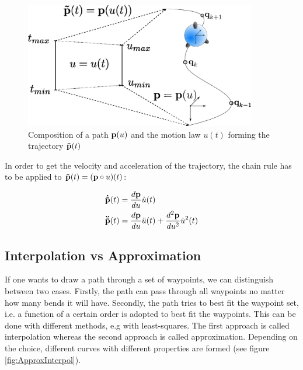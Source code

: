 \begin{figure}[H]
	\centering
    \includegraphics[width = 0.9\textwidth]{graphics/PathTrajectory.eps}
  \caption{Composition of a path ${\bf p}(u)$ and the motion law $u(t)$ forming the trajectory ${\bf \tilde{p}}(t)$}
  \label{fig:path_trajectory}
\end{figure}


In order to get the velocity and acceleration of the trajectory, the chain rule has to be applied to ${\bf \tilde{p}}(t)=({\bf p}\circ u)(t)$:

\begin{align}\label{vel_acc}
{\bf \dot{\tilde{p}}}(t) &= \frac{d {\bf p}}{du}\dot{u}(t) \\
{\bf \ddot{\tilde{p}}}(t) &= \frac{d {\bf p}}{du}\ddot{u}(t)+\frac{d^{2} {\bf p}}{du^{2}}\dot{u}^{2}(t)
\end{align}






\subsection{Interpolation vs Approximation}
If one wants to draw a path through a set of waypoints, we can distinguish between two cases. Firstly, the path can pass through all waypoints no matter how many bends it will have. Secondly, the path tries to best fit the waypoint set, i.e. a function of a  certain order is adopted to best fit the waypoints. This can be done with different methods, e.g with least-squares. The first approach is called interpolation whereas the second approach is called approximation. Depending on the choice, different curves with different properties are formed (see figure \ref{fig:ApproxInterpol}).  


